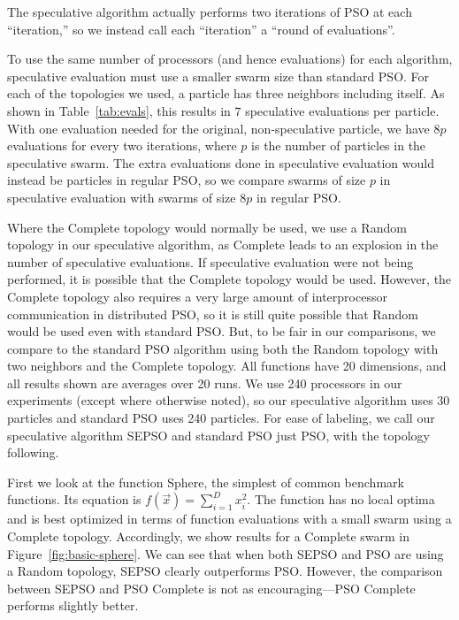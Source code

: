 \documentclass[journal,letterpaper]{IEEEtran}
\newcommand{\fig}[1]{Figure~\ref{fig:#1}}
\begin{document}
The speculative algorithm actually performs two iterations of PSO at each
``iteration,'' so we instead call each ``iteration'' a ``round of
evaluations''.

To use the same number of processors (and hence evaluations) for each
algorithm, speculative evaluation must use a smaller swarm size than standard
PSO.  For each of the topologies we used, a particle has three neighbors
including itself.  As shown in Table~\ref{tab:evals}, this results in $7$
speculative evaluations per particle.  With one evaluation needed for the
original, non-speculative particle, we have $8p$ evaluations for every two
iterations, where $p$ is the number of particles in the speculative swarm.
The extra evaluations done in speculative evaluation would instead be particles
in regular PSO, so we compare swarms of size $p$ in speculative evaluation
with swarms of size $8p$ in regular PSO.

Where the Complete topology would normally be used, we use a Random topology in
our speculative algorithm, as Complete leads to an explosion in the number of
speculative evaluations.  If speculative evaluation were not being performed,
it is possible that the Complete topology would be used.  However, the Complete
topology also requires a very large amount of interprocessor communication in
distributed PSO, so it is still quite possible that Random would be used even
with standard PSO.  But, to be fair in our comparisons, we compare to the
standard PSO algorithm using both the Random topology with two neighbors and
the Complete topology.  All functions have 20 dimensions, and all results shown
are averages over 20 runs.  We use 240 processors in our experiments (except
where otherwise noted), so our speculative algorithm uses 30 particles and
standard PSO uses 240 particles.  For ease of labeling, we call our speculative
algorithm SEPSO and standard PSO just PSO, with the topology following.

First we look at the function Sphere, the simplest of common benchmark
functions.  Its equation is $f(\Vec{x}) = \sum_{i=1}^D x_i^2$.  The function
has no local optima and is best optimized in terms of function evaluations with
a small swarm using a Complete topology.  Accordingly, we show results for a
Complete swarm in \fig{basic-sphere}.  We can see that when both SEPSO and PSO
are using a Random topology, SEPSO clearly outperforms PSO.  However, the
comparison between SEPSO and PSO Complete is not as encouraging---PSO Complete
performs slightly better.
\end{document}
